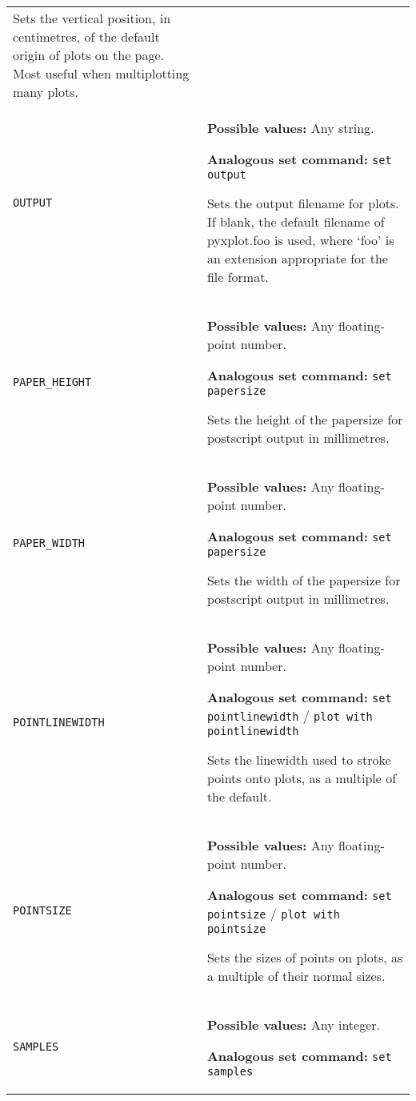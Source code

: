 \begin{longtable}{p{3.4cm}p{9cm}}
                   Sets the vertical position, in centimetres, of the default origin of plots on the page. Most useful when multiplotting many plots.
                   \\
{\tt OUTPUT} & {\bf Possible values:} Any string.

                   {\bf Analogous set command:} {\tt set output}\index{set output command@{\tt set output} command}

                   Sets the output filename for plots. If blank, the default filename of pyxplot.foo is used, where `foo' is an extension appropriate for the file format.
                   \\
{\tt PAPER\_HEIGHT} & {\bf Possible values:} Any floating-point number.

                   {\bf Analogous set command:} {\tt set papersize}\index{set papersize command@{\tt set papersize} command}

                   Sets the height of the papersize for postscript output in millimetres.
                   \\
{\tt PAPER\_WIDTH} & {\bf Possible values:} Any floating-point number.

                   {\bf Analogous set command:} {\tt set papersize}\index{set papersize command@{\tt set papersize} command}

                   Sets the width of the papersize for postscript output in millimetres.
                   \\
{\tt POINTLINEWIDTH} & {\bf Possible values:} Any floating-point number.

                   {\bf Analogous set command:} {\tt set pointlinewidth} / {\tt plot with pointlinewidth}\index{set pointlinewidth command@{\tt set pointlinewidth} command}

                   Sets the linewidth used to stroke points onto plots, as a multiple of the default.
                   \\
{\tt POINTSIZE} & {\bf Possible values:} Any floating-point number.

                   {\bf Analogous set command:} {\tt set pointsize} / {\tt plot with pointsize}\index{set pointsize command@{\tt set pointsize} command}

                   Sets the sizes of points on plots, as a multiple of their normal sizes.
                   \\
{\tt SAMPLES} & {\bf Possible values:} Any integer.

                   {\bf Analogous set command:} {\tt set samples}\index{set samples command@{\tt set samples} command}


\end{longtable}
